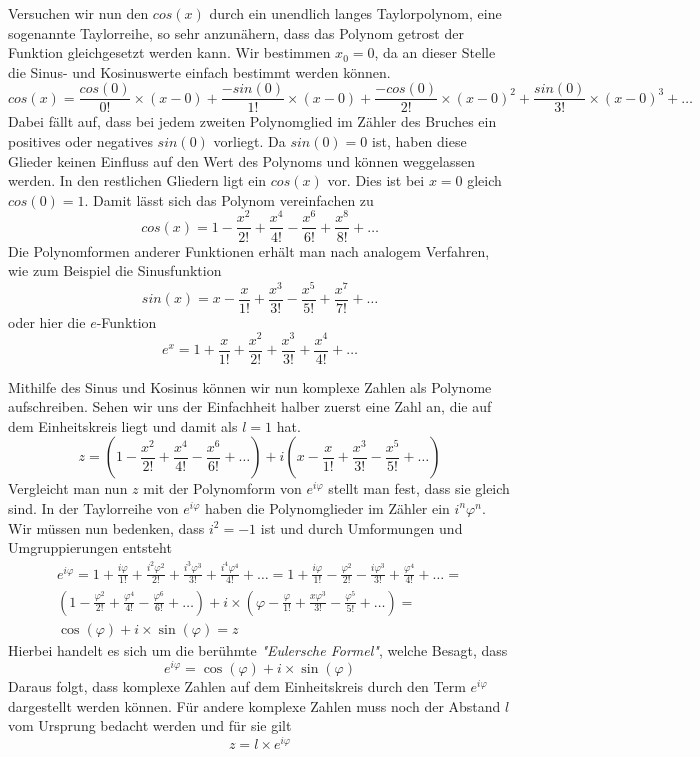 \documentclass[a4paper,12pt]{article} %
\begin{document}
Versuchen wir nun den $cos(x)$ durch ein unendlich langes Taylorpolynom, eine sogenannte Taylorreihe, so sehr anzunähern, dass das Polynom getrost der Funktion gleichgesetzt werden kann.
Wir bestimmen $x_0=0$, da an dieser Stelle die Sinus- und Kosinuswerte einfach bestimmt werden können.
\[cos(x)=\frac{cos(0)}{0!}\times(x-0) + \frac{-sin(0)}{1!}\times(x-0) + \frac{-cos(0)}{2!}\times(x-0)^2+\frac{sin(0)}{3!}\times(x-0)^3+\dots\]
Dabei fällt auf, dass bei jedem zweiten Polynomglied im Zähler des Bruches ein positives oder negatives $sin(0)$ vorliegt.
Da $sin(0)=0$ ist, haben diese Glieder keinen Einfluss auf den Wert des Polynoms und können weggelassen werden. In den restlichen Gliedern ligt ein $cos(x)$ vor. Dies ist bei $x=0$ gleich $cos(0)=1$. Damit lässt sich das Polynom vereinfachen zu
\[cos(x)=1-\frac{x^2}{2!}+\frac{x^4}{4!}-\frac{x^6}{6!}+\frac{x^8}{8!}+\dots\]
Die Polynomformen anderer Funktionen erhält man nach analogem Verfahren, wie zum Beispiel die Sinusfunktion
\[sin(x)=x-\frac{x}{1!}+\frac{x^3}{3!}-\frac{x^5}{5!}+\frac{x^7}{7!}+\dots\]
oder hier die $e$-Funktion
\[e^x=1+\frac{x}{1!}+\frac{x^2}{2!}+\frac{x^3}{3!}+\frac{x^4}{4!}+\dots\]

Mithilfe des Sinus und Kosinus können wir nun komplexe Zahlen als Polynome aufschreiben. Sehen wir uns der Einfachheit halber zuerst eine Zahl an, die auf dem Einheitskreis liegt und damit als $l=1$ hat.
\begin{equation}
	z=%
	\left(1-\frac{x^2}{2!}+\frac{x^4}{4!}-\frac{x^6}{6!}+\dots\right)+i\left(x-\frac{x}{1!}+\frac{x^3}{3!}-\frac{x^5}{5!}+\dots\right)
\end{equation}
Vergleicht man nun $z$ mit der Polynomform von $e^{i\varphi}$ stellt man fest, dass sie gleich sind. 
In der Taylorreihe von $e^{i\varphi}$ haben die Polynomglieder im Zähler ein $i^n\varphi^n$. Wir müssen nun bedenken, dass $i^2=-1$ ist und durch Umformungen und Umgruppierungen entsteht
\begin{multline}	%
	e^{i\varphi}=1+\frac{i\varphi}{1!}+\frac{i^2\varphi^2}{2!}+\frac{i^3\varphi^3}{3!}+\frac{i^4\varphi^4}{4!}+\dots=
	1+\frac{i\varphi}{1!}-\frac{\varphi^2}{2!}-\frac{i\varphi^3}{3!}+\frac{\varphi^4}{4!}+\dots=\\
	\left(1-\frac{\varphi^2}{2!}+\frac{\varphi^4}{4!}-\frac{\varphi^6}{6!}+\dots\right)+i\times\left(\varphi-\frac{\varphi}{1!}+\frac{x\varphi^3}{3!}-\frac{\varphi^5}{5!}+\dots\right) =\\
	\cos(\varphi) + i\times\sin(\varphi)=z
\end{multline}
Hierbei handelt es sich um die berühmte \emph{"{}Eulersche Formel"}, welche Besagt, dass
\begin{equation} \label{euler}
	e^{i\varphi}=\cos(\varphi)+i\times\sin(\varphi)
\end{equation}
Daraus folgt, dass komplexe Zahlen auf dem Einheitskreis durch den Term $e^{i\varphi}$ dargestellt werden können. Für andere komplexe Zahlen muss noch der Abstand $l$ vom Ursprung bedacht werden und für sie gilt
\[z=l\times e^{i\varphi}\]
\end{document}

